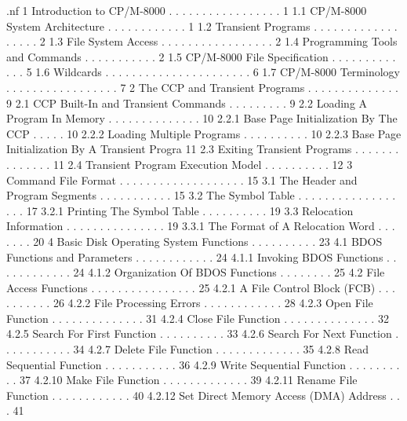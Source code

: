 .nf
1 Introduction to CP/M-8000  . . . . . . . . . . . . . . . . .   1 
   1.1  CP/M-8000 System Architecture  . . . . . . . . . . . .   1 
   1.2 Transient Programs . . . . . . . . . . . . . . . . . .   2 
   1.3  File System Access  . . . . . . . . . . . . . . . . .   2 
   1.4  Programming Tools and Commands  . . . . . . . . . . .   2 
   1.5  CP/M-8000 File Specification . . . . . . . . . . . . .   5 
   1.6  Wildcards . . . . . . . . . . . . . . . . . . . . . .   6 
   1.7 CP/M-8000 Terminology . . . . . . . . . . . . . . . . .   7 
2  The CCP and Transient Programs . . . . . . . . . . . . . .   9 
   2.1  CCP Built-In and Transient Commands . . . . . . . . .   9 
2.2  Loading A Program In Memory  . . . . . . . . . . . . . .  10 
        2.2.1  Base Page Initialization By The CCP  . . . . .  10 
        2.2.2  Loading Multiple Programs  . . . . . . . . . .  10 
        2.2.3  Base Page Initialization By A Transient Progra  11 
   2.3 Exiting Transient Programs . . . . . . . . . . . . . .  11 
   2.4  Transient Program Execution Model . . . . . . . . . .  12 
3  Command File Format  . . . . . . . . . . . . . . . . . . .  15 
   3.1  The Header and Program Segments . . . . . . . . . . .  15 
   3.2  The Symbol Table  . . . . . . . . . . . . . . . . . .  17 
        3.2.1  Printing The Symbol Table  . . . . . . . . . .  19 
   3.3  Relocation Information  . . . . . . . . . . . . . . .  19 
        3.3.1  The Format of A Relocation Word  . . . . . . .  20 
4  Basic Disk Operating System Functions  . . . . . . . . . .  23 
   4.1  BDOS Functions and Parameters . . . . . . . . . . . .  24 
        4.1.1 Invoking BDOS Functions . . . . . . . . . . . .  24 
        4.1.2  Organization Of BDOS Functions . . . . . . . .  25 
   4.2  File Access Functions . . . . . . . . . . . . . . . .  25 
        4.2.1  A File Control Block (FCB) . . . . . . . . . .  26 
        4.2.2  File Processing Errors . . . . . . . . . . . .  28 
        4.2.3  Open File Function . . . . . . . . . . . . . .  31 
        4.2.4 Close File Function . . . . . . . . . . . . . .  32 
        4.2.5  Search For First Function  . . . . . . . . . .  33 
        4.2.6  Search For Next Function . . . . . . . . . . .  34 
        4.2.7  Delete File Function . . . . . . . . . . . . .  35 
        4.2.8  Read Sequential Function . . . . . . . . . . .  36 
        4.2.9  Write Sequential Function  . . . . . . . . . .  37 
        4.2.10  Make File Function  . . . . . . . . . . . . .  39 
        4.2.11  Rename File Function  . . . . . . . . . . . .  40 
        4.2.12  Set Direct Memory Access (DMA) Address  . . .  41 
